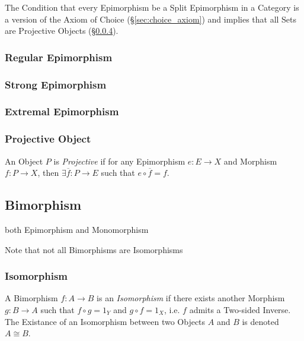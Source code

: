 The Condition that every Epimorphism be a Split Epimorphism in a
Category is a version of the Axiom of Choice
(\S\ref{sec:choice_axiom}) and implies that all Sets are Projective
Objects (\S\ref{sec:projective_object}).\cite{awodey06}



\subsubsection{Regular Epimorphism}\label{sec:regular_epimorphism}

\subsubsection{Strong Epimorphism}\label{sec:strong_epimorphism}

\subsubsection{Extremal Epimorphism}\label{sec:extremal_epimorphism}

\subsubsection{Projective Object}\label{sec:projective_object}

An Object $P$ is \emph{Projective} if for any Epimorphism $e : E
\rightarrow X$ and Morphism $f : P \rightarrow X$, then $\exists
\overline{f} : P \rightarrow E$ such that $e \circ \overline{f} = f$.



\subsection{Bimorphism}\label{sec:bimorphism}

both Epimorphism and Monomorphism

\HandRight\; Note that not all Bimorphisms are Isomorphisms



\subsubsection{Isomorphism}\label{sec:isomorphism}

A Bimorphism $f : A \rightarrow B$ is an \emph{Isomorphism} if there
exists another Morphism $g : B \rightarrow A$ such that $f \circ g =
1_Y$ and $g \circ f = 1_X$, i.e. $f$ admits a Two-sided Inverse. The
Existance of an Isomorphism between two Objects $A$ and $B$ is denoted
$A \cong B$.

